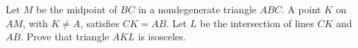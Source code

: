Let $M$ be the midpoint of $BC$ in a nondegenerate triangle $ABC$. A point $K$ on $AM$, with $K\ne A$, satisfies $CK=AB$. Let $L$ be the intersection of lines $CK$ and $AB$. Prove that triangle $AKL$ is isosceles.
